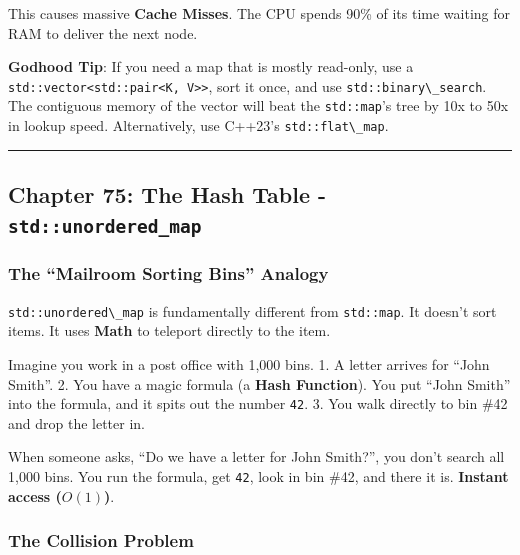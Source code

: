 This causes massive \textbf{Cache Misses}. The CPU spends 90\% of its
time waiting for RAM to deliver the next node.

\textbf{Godhood Tip}: If you need a map that is mostly read-only, use a
\passthrough{\lstinline!std::vector<std::pair<K, V>>!}, sort it once,
and use \passthrough{\lstinline!std::binary\_search!}. The contiguous
memory of the vector will beat the \passthrough{\lstinline!std::map!}'s
tree by 10x to 50x in lookup speed. Alternatively, use C++23's
\passthrough{\lstinline!std::flat\_map!}.

\begin{center}\rule{0.5\linewidth}{0.5pt}\end{center}

\hypertarget{chapter-75-the-hash-table---stdunordered_map}{%
\subsection{\texorpdfstring{Chapter 75: The Hash Table -
\texttt{std::unordered\_map}}{Chapter 75: The Hash Table - std::unordered\_map}}\label{chapter-75-the-hash-table---stdunordered_map}}

\hypertarget{the-mailroom-sorting-bins-analogy}{%
\subsubsection{The ``Mailroom Sorting Bins''
Analogy}\label{the-mailroom-sorting-bins-analogy}}

\passthrough{\lstinline!std::unordered\_map!} is fundamentally different
from \passthrough{\lstinline!std::map!}. It doesn't sort items. It uses
\textbf{Math} to teleport directly to the item.

Imagine you work in a post office with 1,000 bins. 1. A letter arrives
for ``John Smith''. 2. You have a magic formula (a \textbf{Hash
Function}). You put ``John Smith'' into the formula, and it spits out
the number \passthrough{\lstinline!42!}. 3. You walk directly to bin
\#42 and drop the letter in.

When someone asks, ``Do we have a letter for John Smith?'', you don't
search all 1,000 bins. You run the formula, get
\passthrough{\lstinline!42!}, look in bin \#42, and there it is.
\textbf{Instant access (\(O(1)\))}.

\hypertarget{the-collision-problem}{%
\subsubsection{The Collision Problem}\label{the-collision-problem}}


